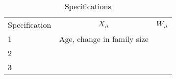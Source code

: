 \begin{table}[t]
\begin{threeparttable}
\begin{tabular}{l c c}
\toprule 
Specification & $X_{it}$ & $W_{it}$ \\ 
1 & Age, change in family size & \\
2 & & \\ 
3 & & \\  
\end{tabular}
\end{threeparttable}
\caption{Specifications}
\label{tab:specs}
\end{table}